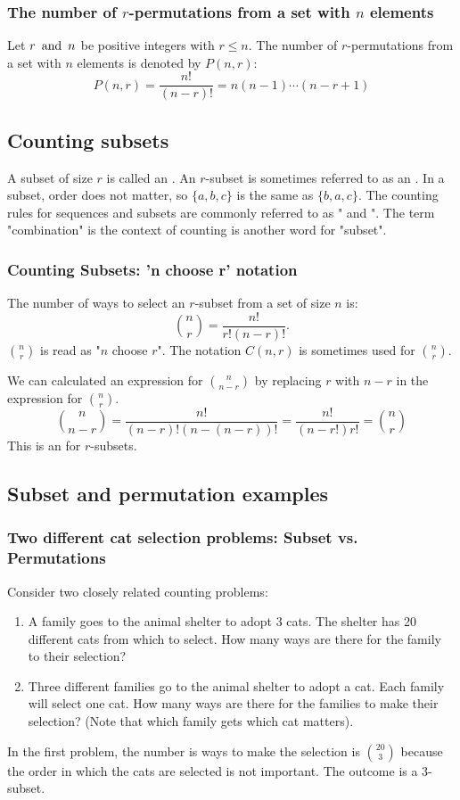 \subsubsection*{The number of $r$-permutations from a set with $n$ elements}
Let $r \operatorname{~\text{and}~} n$ be positive integers with $r \leq n$. The number of $r$-permutations from a set with $n$ elements is denoted by $P(n,r)$:
\[
  P(n,r) = \frac{n!}{(n-r)!} = n(n-1)\cdots(n-r+1)
\]

\subsection{Counting subsets}
A subset of size $r$ is called an . An $r$-subset is sometimes referred to as an . In a subset, order does not matter, so $\{a,b,c\}$ is the same as $\{b,a,c\}$. The counting rules for sequences and subsets are commonly referred to as " and ". The term "combination" is the context of counting is another word for "subset".

\subsubsection*{Counting Subsets: 'n choose r' notation}
The number of ways to select an $r$-subset from a set of size $n$ is:
\[
  \binom{n}{r} = \frac{n!}{r!(n-r)!}.
\]
$\binom{n}{r}$ is read as "$n$ choose $r$". The notation $C(n,r)$ is sometimes used for $\binom{n}{r}$.

We can calculated an expression for $\binom{n}{n-r}$ by replacing $r$ with $n-r$ in the expression for $\binom{n}{r}$.
\[
  \binom{n}{n-r} = \frac{n!}{(n-r)!(n-(n-r))!} = \frac{n!}{(n-r!)r!} =
  \binom{n}{r}
\]
This is an  for $r$-subsets.

\subsection{Subset and permutation examples}

\subsubsection*{Two different cat selection problems: Subset vs. Permutations}
Consider two closely related counting problems:
\begin{enumerate}
  \item A family goes to the animal shelter to adopt 3 cats. The shelter has 20 different cats from which to select. How many ways are there for the family to their selection?
  \item Three different families go to the animal shelter to adopt a cat. Each family will select one cat. How many ways are there for the families to make their selection? (Note that which family gets which cat matters).
\end{enumerate}
In the first problem, the number is ways to make the selection is $\binom{20}{3}$ because the order in which the cats are selected is not important. The outcome is a 3-subset.

